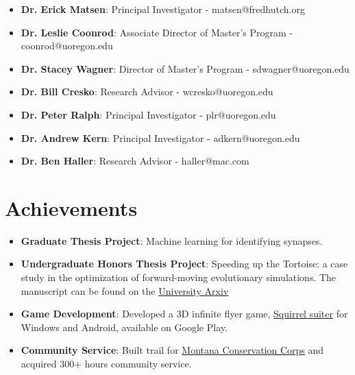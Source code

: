 \documentclass[letterpaper,10pt]{article}
\newcommand{\resumeNoWrapItem}[2]{
  \item\small{
    \textbf{#1}{: #2 \vspace{-2pt}}
  }
}
\newcommand{\resumeSubItem}[2]{\resumeNoWrapItem{#1}{#2}\vspace{-3pt}}
\newcommand{\resumeSubHeadingListStart}{\begin{itemize}[leftmargin=*]}
\newcommand{\resumeSubHeadingListEnd}{\end{itemize}}
\begin{document}
\resumeSubHeadingListStart
    
    \resumeSubItem {Dr. Erick Matsen}
        {Principal Investigator -
        matsen@fredhutch.org}
\resumeSubItem {Dr. Leslie Coonrod}
        {Associate Director of Master's Program -
        coonrod@uoregon.edu}
    \resumeSubItem {Dr. Stacey Wagner}
        {Director of Master's Program -
        sdwagner@uoregon.edu}
    \resumeSubItem {Dr. Bill Cresko}
        {Research Advisor -
        wcresko@uoregon.edu}
    \resumeSubItem {Dr. Peter Ralph}
        {Principal Investigator -
        plr@uoregon.edu}
    \resumeSubItem {Dr. Andrew Kern}
        {Principal Investigator -
        adkern@uoregon.edu}
    \resumeSubItem {Dr. Ben Haller}
        {Research Advisor - 
        haller@mac.com}
\resumeSubHeadingListEnd

\section{Achievements}

\resumeSubHeadingListStart
    \resumeSubItem{Graduate Thesis Project}
    {
        Machine learning for identifying synapses.
    }
    \resumeSubItem{Undergraduate Honors Thesis Project}
    {
        Speeding up the Tortoise: a case study in the optimization of forward-moving evolutionary simulations.
        The manuscript can be found on the 
        \href{https://www.cs.uoregon.edu/Reports/UG-201806-Galloway.pdf}{University Arxiv}
    }
    \resumeSubItem{Game Development}
    {
        Developed a 3D infinite flyer game,
        \href{https://play.google.com/store/apps/details?id=com.Nighthawks.SquirrelSuiter&hl=en_US}{Squirrel suiter} 
        for Windows and Android, available on Google Play.
    }
    \resumeSubItem{Community Service}
    {
        Built trail for 
        \href{https://www.mtcorps.org/joinmcc/open-positions/?gclid=CjwKCAiAkp6tBhB5EiwANTCx1LErxt8iVHJUsmKRme2uhYbYdg1lW3F5nl2XQ3P7Wp9yzlKZ-Uv1oxoCPSQQAvD_BwE}{Montana Conservation Corps} 
        and acquired 300+
        hours community service.
    }

\resumeSubHeadingListEnd
\end{document}
